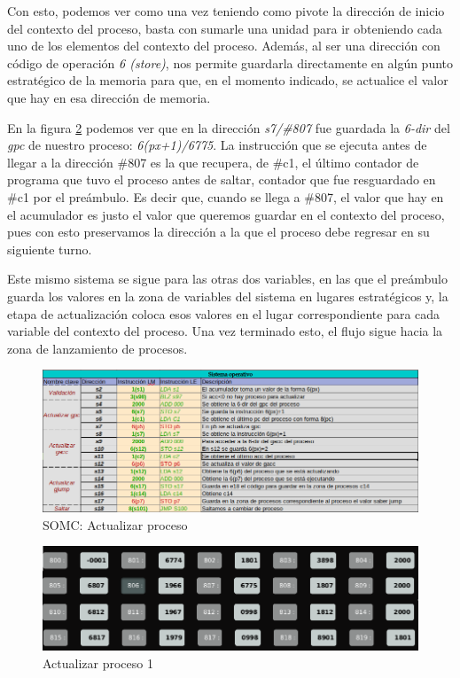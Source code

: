 \documentclass[letterpaper,12pt,oneside]{book}
\begin{document}
  		Con esto, podemos ver como una vez teniendo como pivote la dirección de inicio del contexto del proceso, basta
  		con sumarle una unidad para ir obteniendo cada uno de los elementos del contexto del proceso. Además, al ser una dirección
  		con código de operación \textit{6 (store)},  nos permite guardarla directamente en algún punto estratégico de la memoria
  		para que, en el momento indicado, se actualice el valor que hay en esa dirección de memoria.
        
        En la figura \ref{fig:Proceso1ActualizarP1} podemos ver que en la dirección \textit{s7/\#807}
        fue guardada la \textit{6-dir} del \textit{gpc} de nuestro proceso: \textit{6(px+1)/6775}. La
		instrucción que se ejecuta antes de llegar a la dirección \#807
		es la que recupera, de \#c1, el último contador de programa que tuvo el proceso 
		antes de saltar, contador que
		fue resguardado en \#c1 por el preámbulo. Es decir que, cuando se llega a \#807, el valor que hay en el acumulador es justo
		el valor que queremos guardar en el contexto del proceso, pues con esto preservamos la dirección a la que el proceso
		debe regresar en su siguiente turno.
		
		Este mismo sistema se sigue para las otras dos variables, en las que el preámbulo guarda los valores
		en la zona de variables del sistema en lugares estratégicos y, la etapa de actualización  coloca esos valores en el lugar correspondiente
		para cada variable del contexto del proceso. Una vez terminado esto, el flujo sigue hacia la zona de lanzamiento de procesos.
		
		
		\begin{figure}[ht]		
			\centering
			\includegraphics[scale=0.55]{media/CARDIACC/SO_ActualizarProceso.png}
			\caption{ SOMC: Actualizar proceso }
			\label{fig:somcActualizarProceso1}
		\end{figure}		
		
		
		\begin{figure}[ht]		
			\centering
			\includegraphics[scale=0.45]{media/CARDIACC/Proceso1ActualizarP1.png}
			\caption{ Actualizar proceso 1}
			\label{fig:Proceso1ActualizarP1}
		\end{figure}		
		
\end{document}
